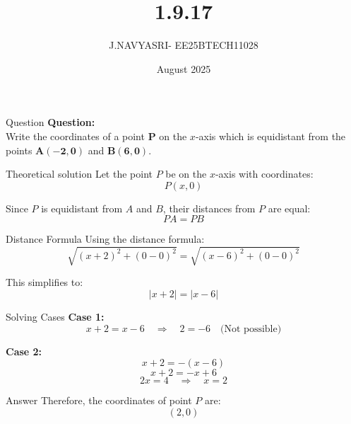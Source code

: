 \documentclass{beamer}
\title %
{1.9.17}
\date{August  2025}
\author %
{J.NAVYASRI- EE25BTECH11028}
\begin{document}
\begin{frame}{Question}
\textbf{Question:} \\
Write the coordinates of a point \(\mathbf{P}\) on the \(x\)-axis which is equidistant from the points \(\mathbf{A(-2, 0)}\) and \(\mathbf{B(6, 0)}\).
\end{frame}

\begin{frame}{Theoretical solution}
Let the point $P$ be on the $x$-axis with coordinates:
\begin{equation}
P(x, 0)
\end{equation}

Since $P$ is equidistant from $A$ and $B$, their distances from $P$ are equal:
\begin{equation}
PA = PB
\end{equation}

\end{frame}

\begin{frame}{Distance Formula}
Using the distance formula:
\begin{equation}
\sqrt{(x + 2)^2 + (0 - 0)^2} = \sqrt{(x - 6)^2 + (0 - 0)^2}
\end{equation}

This simplifies to:
\begin{equation}
|x + 2| = |x - 6|
\end{equation}

\end{frame}

\begin{frame}{Solving Cases}
\textbf{Case 1:}
\begin{equation}
x + 2 = x - 6 \quad \Rightarrow \quad 2 = -6 \quad \text{(Not possible)}
\end{equation}

\textbf{Case 2:}
\begin{equation}
x + 2 = -(x - 6) 
\end{equation}
\[ x + 2 = -x + 6 \] 
\[ 2x = 4 \quad \Rightarrow \quad x = 2 \]
\end{frame}

\begin{frame}{Answer}
Therefore, the coordinates of point $P$ are:
\begin{equation}
\boxed{(2, 0)}
\end{equation}
\end{frame}
\end{document}
